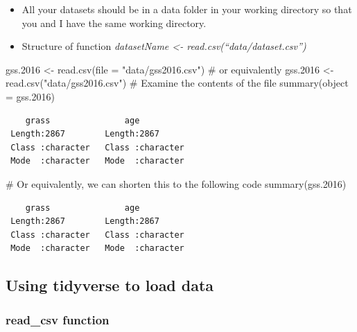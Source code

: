 \documentclass[
  letterpaper,
  DIV=11,
  numbers=noendperiod]{scrreprt}
\newenvironment{Shaded}{\begin{snugshade}}{\end{snugshade}}
\newcommand{\AttributeTok}[1]{\textcolor[rgb]{0.40,0.45,0.13}{#1}}
\newcommand{\CommentTok}[1]{\textcolor[rgb]{0.37,0.37,0.37}{#1}}
\newcommand{\FloatTok}[1]{\textcolor[rgb]{0.68,0.00,0.00}{#1}}
\newcommand{\FunctionTok}[1]{\textcolor[rgb]{0.28,0.35,0.67}{#1}}
\newcommand{\NormalTok}[1]{\textcolor[rgb]{0.00,0.23,0.31}{#1}}
\newcommand{\OtherTok}[1]{\textcolor[rgb]{0.00,0.23,0.31}{#1}}
\newcommand{\StringTok}[1]{\textcolor[rgb]{0.13,0.47,0.30}{#1}}
\providecommand{\tightlist}{%
  \setlength{\itemsep}{0pt}\setlength{\parskip}{0pt}}\usepackage{longtable,booktabs,array}
\begin{document}
\begin{itemize}
\tightlist
\item
  All your datasets should be in a data folder in your working directory
  so that you and I have the same working directory.
\item
  Structure of function \emph{datasetName \textless-
  read.csv(``data/dataset.csv'')}
\end{itemize}

\begin{Shaded}
\begin{Highlighting}[]
\NormalTok{gss}\FloatTok{.2016} \OtherTok{\textless{}{-}} \FunctionTok{read.csv}\NormalTok{(}\AttributeTok{file =} \StringTok{"data/gss2016.csv"}\NormalTok{)}
\CommentTok{\# or equivalently}
\NormalTok{gss}\FloatTok{.2016} \OtherTok{\textless{}{-}} \FunctionTok{read.csv}\NormalTok{(}\StringTok{"data/gss2016.csv"}\NormalTok{)}
\CommentTok{\# Examine the contents of the file}
\FunctionTok{summary}\NormalTok{(}\AttributeTok{object =}\NormalTok{ gss}\FloatTok{.2016}\NormalTok{)}
\end{Highlighting}
\end{Shaded}

\begin{verbatim}
    grass               age           
 Length:2867        Length:2867       
 Class :character   Class :character  
 Mode  :character   Mode  :character  
\end{verbatim}

\begin{Shaded}
\begin{Highlighting}[]
\CommentTok{\# Or equivalently, we can shorten this to the following code}
\FunctionTok{summary}\NormalTok{(gss}\FloatTok{.2016}\NormalTok{)}
\end{Highlighting}
\end{Shaded}

\begin{verbatim}
    grass               age           
 Length:2867        Length:2867       
 Class :character   Class :character  
 Mode  :character   Mode  :character  
\end{verbatim}

\subsection{Using tidyverse to load
data}\label{using-tidyverse-to-load-data}

\subsubsection{read\_csv function}\label{read_csv-function}
\end{document}
